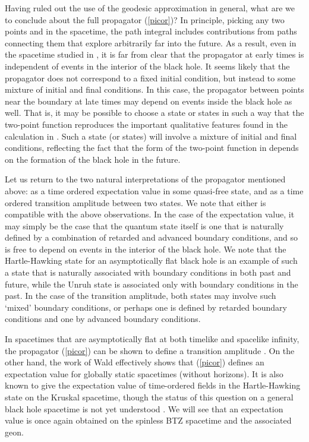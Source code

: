 \documentclass[a4paper,12pt]{article}
\begin{document}
Having ruled out the use of the geodesic approximation in general,
what are we to conclude about the full propagator (\ref{picor})?  In
principle, picking any two points \coordHE{} and \coordHE{} in the spacetime, the
path integral includes contributions from paths connecting them that
explore arbitrarily far into the future.  As a result, even in the
spacetime studied in \cite{holopart}, it is far from clear that the
propagator at early times is independent of events in the interior of
the black hole.  It seems likely that the propagator does not
correspond to a fixed initial condition, but instead to some mixture
of initial and final conditions.  In this case, the propagator between
points near the boundary at late times may depend on events inside the
black hole as well. That is, it may be possible to choose a state or
states in such a way that the two-point function reproduces the
important qualitative features found in the calculation in
\cite{holopart}. Such a state (or states) will involve a mixture of
initial and final conditions, reflecting the fact that the form of the
two-point function in \cite{holopart} depends on the formation of the
black hole in the future.

Let us return to the two natural interpretations of the propagator
mentioned above: as a time ordered expectation value in some
quasi-free state, and as a time ordered transition amplitude between
two states.  We note that either is compatible with the above
observations.  In the case of the expectation value, it may simply be
the case that the quantum state itself is one that is naturally
defined by a combination of retarded and advanced boundary conditions,
and so is free to depend on events in the interior of the black hole.
We note that the Hartle-Hawking state for an asymptotically flat black
hole is an example of such a state that is naturally associated with
boundary conditions in both past and future, while the Unruh state is
associated only with boundary conditions in the past.  In the case of
the transition amplitude, both states may involve such `mixed'
boundary conditions, or perhaps one is defined by retarded boundary
conditions and one by advanced boundary conditions.

In spacetimes that are asymptotically flat at both timelike and
spacelike infinity, the propagator (\ref{picor}) can be shown to
define a transition amplitude \cite{DeWitt}.  On the other hand, the
work of Wald \cite{Wald2} effectively shows that (\ref{picor}) defines
an expectation value for globally static spacetimes (without
horizons). It is also known to give the expectation value of
time-ordered fields in the Hartle-Hawking state on the Kruskal
spacetime, though the status of this question on a general black hole
spacetime is not yet understood \cite{RMW}.  We will see that an
expectation value is once again obtained on the spinless BTZ spacetime
and the associated \coordHE{} geon.
\end{document}
